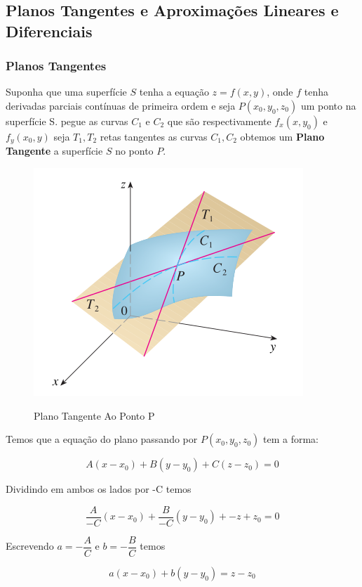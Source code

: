 \subsection{Planos Tangentes e Aproximações Lineares e Diferenciais}

\subsubsection{Planos Tangentes}

Suponha que uma superfície $S$ tenha a equação $z = f(x, y)$, onde $f$ tenha derivadas parciais contínuas de primeira ordem e seja $P(x_0, y_0, z_0)$ um ponto na superfície S. pegue as curvas $C_1$ e $C_2$ que são respectivamente $f_x(x, y_0)$ e $f_y(x_0, y)$ seja $T_1, T_2$ retas tangentes as curvas $C_1, C_2$ obtemos um \textbf{Plano Tangente} a superfície $S$ no ponto $P$. 


\begin{figure}[H]
	\centering
	\includegraphics[width=0.4\linewidth]{pictures/plano.png}
	\label{fig:interpretacao}
	\caption{Plano Tangente Ao Ponto P}
\end{figure}

Temos que a equação do plano passando por $P(x_0, y_0, z_0)$ tem a forma: 

\begin{equation}
	A(x - x_0) + B(y - y_0) + C(z - z_0) = 0
	\label{equacao_plano_1}
\end{equation}

Dividindo em ambos os lados por -C temos 

\begin{equation}
	\dfrac{A}{-C}(x - x_0) + \dfrac{B}{-C}(y - y_0) + -z + z_0 = 0
	\label{equacao_plano_2}
\end{equation}

Escrevendo $a = -\dfrac{A}{C}$ e $b = -\dfrac{B}{C}$ temos 


\begin{equation}
	a(x - x_0) + b(y - y_0) = z - z_0 
	\label{equacao_plano_3}
\end{equation}

